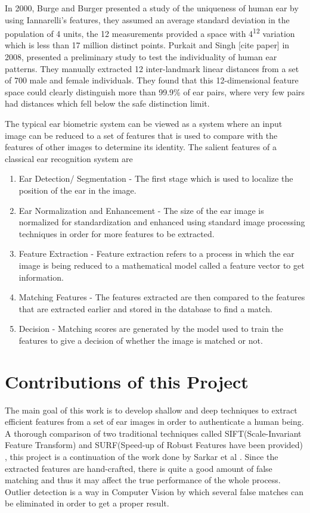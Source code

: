 In 2000, Burge and Burger\cite{burger} presented a study of the uniqueness of human ear by using Iannarelli's features, they assumed an average standard deviation in the population of 4 units, the 12 measurements provided a space with 4\textsuperscript{12} variation which is less than 17 million distinct points. Purkait and Singh [cite paper] in 2008, presented a preliminary study to test the individuality of human ear patterns. They manually extracted 12 inter-landmark linear distances from a set of 700 male and female individuals. They found that this 12-dimensional feature space could clearly distinguish more than 99.9{\%} of ear pairs, where very few pairs had distances which fell below the safe distinction limit.

The typical ear biometric system can be viewed as a system where an input image can be reduced to a set of features that is used to compare with the features of other images to determine its identity. The salient features of a classical ear recognition system are\cite{abaza} 

\begin{enumerate}
\item Ear Detection/ Segmentation - The first stage which is used to localize the position of the ear in the image.
\item Ear Normalization and Enhancement - The size of the ear image is normalized for standardization and enhanced using standard image processing techniques in order for more features to be extracted.
\item Feature Extraction - Feature extraction refers to a process in which the ear image is being reduced to a mathematical model called a feature vector to get information.
\item Matching Features - The features extracted are then compared to the features that are extracted earlier and stored in the database to find a match.
\item Decision - Matching scores are generated by the model used to train the features to give a decision of whether the image is matched or not.
\end{enumerate}



\section{Contributions of this Project} The main goal of this work is to develop
shallow and deep techniques to extract efficient features from a set of ear images in order to authenticate a human being. A thorough comparison of two traditional techniques called SIFT(Scale-Invariant Feature Transform) \cite{sift1} \cite{sift2} and SURF(Speed-up of Robust Features have been provided) \cite{surf}, this project is a continuation of the work done by Sarkar et al \cite{sarkar}. Since the extracted features are hand-crafted, there is quite a good amount of false matching and thus it may affect the true performance of the whole process. Outlier detection is a way in Computer Vision by which several false matches can be eliminated in order to get a proper result. 
